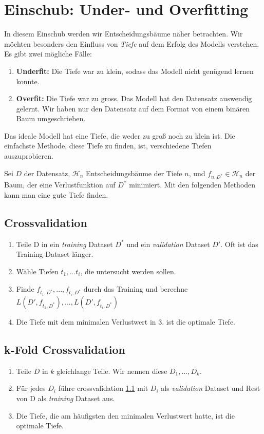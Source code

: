 \section{Einschub: Under- und Overfitting}
In diesem Einschub werden wir Entscheidungsbäume näher betrachten. Wir möchten besonders den Einfluss von \textit{Tiefe} auf dem Erfolg des Modells verstehen.\\ 

Es gibt zwei mögliche Fälle:
\begin{enumerate}
    \item \textbf{Underfit: } Die Tiefe war zu klein, sodass das Modell nicht genügend lernen konnte.
    \item \textbf{Overfit: } Die Tiefe war zu gross. Das Modell hat den Datensatz auswendig gelernt. Wir haben nur den Datensatz auf dem Format von einem binären Baum umgeschrieben.
\end{enumerate}
Das ideale Modell hat eine Tiefe, die weder zu groß noch zu klein ist. Die einfachste Methode, diese Tiefe zu finden, ist, verschiedene Tiefen auszuprobieren. 

Sei $D$ der Datensatz, $\mathcal{H}_n$ Entscheidungsbäume der Tiefe $n$, und $f_{n,D^*} \in \mathcal{H}_n$ der Baum, der eine Verlustfunktion auf $D^*$ minimiert. Mit den folgenden Methoden kann man eine gute Tiefe finden.
\subsection{Crossvalidation} \label{ML-Crossval}
\begin{enumerate}
    \item Teile D in ein \textit{training} Dataset $D^*$ und ein \textit{validation} Dataset $D'$. Oft ist das Training-Dataset länger. 
    \item Wähle Tiefen $t_1,...t_i$, die untersucht werden sollen.
    \item Finde $f_{t_1,D^*},...,f_{t_i,D^*}$ durch das Training und berechne $L(D',f_{t_1,D^*}),...,L(D',f_{t_i,D^*})$
    \item  Die Tiefe mit dem minimalen Verlustwert in 3. ist die optimale Tiefe.

\end{enumerate}
\subsection{k-Fold Crossvalidation}
\begin{enumerate}
    \item Teile $D$ in $k$ gleichlange Teile. Wir nennen diese $D_1,...,D_k$. 
    \item Für jedes $D_i$ führe crossvalidation \ref{ML-Crossval} mit $D_i$ als \textit{validation} Dataset und Rest von D als \textit{training} Dataset aus. 
    \item Die Tiefe, die am häufigsten den minimalen Verlustwert hatte, ist die optimale Tiefe. 
\end{enumerate}

